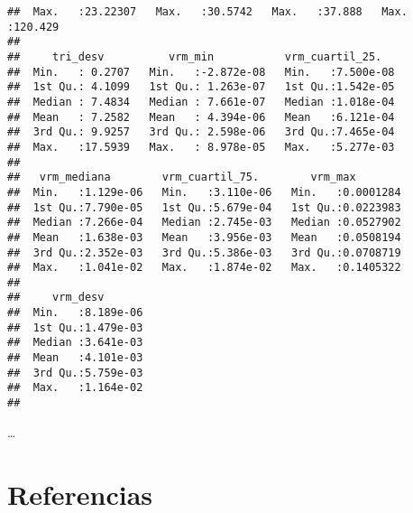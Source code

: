 \documentclass[11pt,]{article}
\begin{document}
\begin{verbatim}
##  Max.   :23.22307   Max.   :30.5742   Max.   :37.888   Max.   :120.429  
##                                                                         
##     tri_desv          vrm_min           vrm_cuartil_25.    
##  Min.   : 0.2707   Min.   :-2.872e-08   Min.   :7.500e-08  
##  1st Qu.: 4.1099   1st Qu.: 1.263e-07   1st Qu.:1.542e-05  
##  Median : 7.4834   Median : 7.661e-07   Median :1.018e-04  
##  Mean   : 7.2582   Mean   : 4.394e-06   Mean   :6.121e-04  
##  3rd Qu.: 9.9257   3rd Qu.: 2.598e-06   3rd Qu.:7.465e-04  
##  Max.   :17.5939   Max.   : 8.978e-05   Max.   :5.277e-03  
##                                                            
##   vrm_mediana        vrm_cuartil_75.        vrm_max         
##  Min.   :1.129e-06   Min.   :3.110e-06   Min.   :0.0001284  
##  1st Qu.:7.790e-05   1st Qu.:5.679e-04   1st Qu.:0.0223983  
##  Median :7.266e-04   Median :2.745e-03   Median :0.0527902  
##  Mean   :1.638e-03   Mean   :3.956e-03   Mean   :0.0508194  
##  3rd Qu.:2.352e-03   3rd Qu.:5.386e-03   3rd Qu.:0.0708719  
##  Max.   :1.041e-02   Max.   :1.874e-02   Max.   :0.1405322  
##                                                             
##     vrm_desv        
##  Min.   :8.189e-06  
##  1st Qu.:1.479e-03  
##  Median :3.641e-03  
##  Mean   :4.101e-03  
##  3rd Qu.:5.759e-03  
##  Max.   :1.164e-02  
## 
\end{verbatim}

\ldots

\section{Referencias}\label{referencias}




\newpage
\singlespacing 
\end{document}
